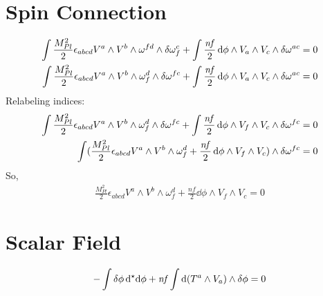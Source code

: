 \documentclass[12pt]{article}
\newcommand{\hodge}{{^\star}}
\begin{document}
\section{Spin Connection}
\begin{align*}
  \int \frac{M_{Pl}^2}{2} \epsilon_{abcd} V^a \wedge V^b \wedge \omega^{fd} \wedge \var{\omega^c_f} + \int \frac{\mathit{nf}}{2} \dd{\phi} \wedge V_a \wedge V_c \wedge \var{\omega^{ac}} = 0 \\
  \int \frac{M_{Pl}^2}{2} \epsilon_{abcd} V^a \wedge V^b \wedge \omega_f^d \wedge \var{\omega^{fc}} + \int \frac{\mathit{nf}}{2} \dd{\phi} \wedge V_a \wedge V_c \wedge \var{\omega^{ac}} = 0
\end{align*}
Relabeling indices:
\begin{align*}
  \int \frac{M_{Pl}^2}{2} \epsilon_{abcd} V^a \wedge V^b \wedge \omega_f^d \wedge \var{\omega^{fc}} + \int \frac{\mathit{nf}}{2} \dd{\phi} \wedge V_f \wedge V_c \wedge \var{\omega^{fc}} = 0 \\
  \int (\frac{M_{Pl}^2}{2} \epsilon_{abcd} V^a \wedge V^b \wedge \omega_f^d + \frac{\mathit{nf}}{2} \dd{\phi} \wedge V_f \wedge V_c) \wedge \var{\omega^{fc}} = 0 \\
\end{align*}
So,
\begin{align*}
  \frac{M_{Pl}^2}{2} \epsilon_{abcd} V^a \wedge V^b \wedge \omega_f^d + \frac{\mathit{nf}}{2} \dd{\phi} \wedge V_f \wedge V_c = 0
\end{align*}

\section{Scalar Field}
\begin{align*}
  - \int \var{\phi}\dd{\hodge{\dd{\phi}}} + \mathit{nf} \int \dd(T^a \wedge V_a) \wedge \var{\phi} = 0
\end{align*}
\end{document}
